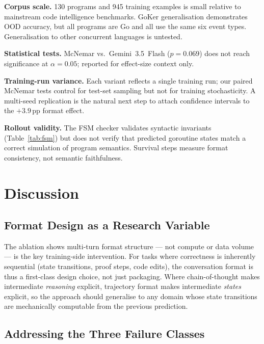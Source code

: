 \documentclass[10pt,conference]{IEEEtran}
\begin{document}
\textbf{Corpus scale.}
130 programs and 945 training examples is small relative to mainstream
code intelligence benchmarks.
GoKer generalisation demonstrates OOD accuracy, but all programs are
Go and all use the same six event types.
Generalisation to other concurrent languages is untested.

\textbf{Statistical tests.}
McNemar vs.\ Gemini~3.5~Flash ($p{=}0.069$) does not reach
significance at $\alpha{=}0.05$; reported for effect-size context only.

\textbf{Training-run variance.}
Each variant reflects a single training run; our paired McNemar tests
control for test-set sampling but not for training stochasticity.
A multi-seed replication is the natural next step to attach confidence
intervals to the $+3.9$\,pp format effect.

\textbf{Rollout validity.}
The FSM checker validates syntactic invariants (Table~\ref{tab:fsm})
but does not verify that predicted goroutine states match a correct
simulation of program semantics.
Survival steps measure format consistency, not semantic faithfulness.

\section{Discussion}\label{sec:discussion}

\subsection{Format Design as a Research Variable}

The ablation shows multi-turn format structure — not compute or
data volume — is the key training-side intervention.
For tasks where correctness is inherently sequential (state
transitions, proof steps, code edits), the conversation format is thus
a first-class design choice, not just packaging.
Where chain-of-thought makes intermediate \emph{reasoning} explicit,
trajectory format makes intermediate \emph{states} explicit, so the
approach should generalise to any domain whose state transitions are
mechanically computable from the previous prediction.

\subsection{Addressing the Three Failure Classes}
\end{document}
